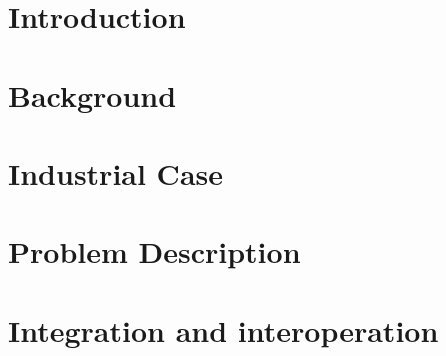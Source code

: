 \chapter{Introduction}


\chapter{Background}


%

%

\chapter{Industrial Case}


\chapter{Problem Description}



\chapter{Integration and interoperation}


%

